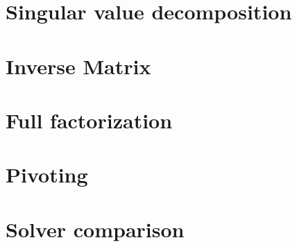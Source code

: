 \documentclass[fontsize = 10pt,DIV = 13]{scrartcl}
\begin{document}







\section{Singular value decomposition}
\label{sec:svd}

\section{Inverse Matrix}
\label{sec:InverseMatrix}

\section{Full factorization}
\label{sec:fullFactorization}

\section{Pivoting}
\label{sec:pivoting}


\section{Solver comparison}
\label{sec:solverSelection}
\end{document}
